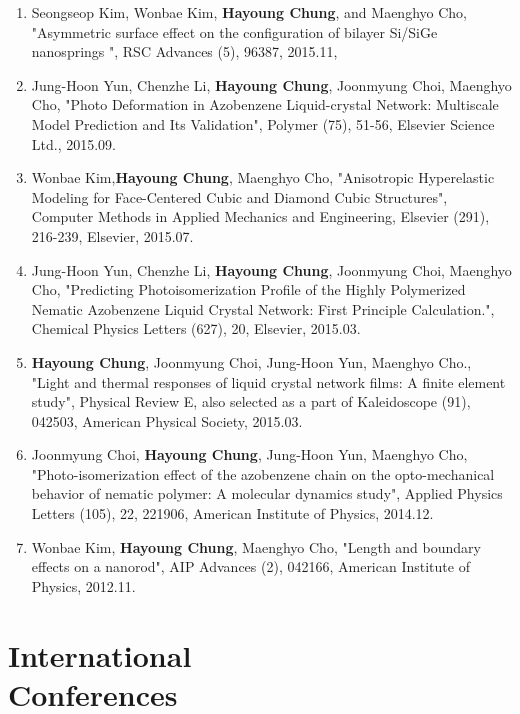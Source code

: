 \documentclass[margin, 10pt]{res} %
\begin{document}
\begin{resume}
\begin{enumerate}
    \item Seongseop Kim, Wonbae Kim, \textbf{Hayoung Chung}, and Maenghyo Cho, "Asymmetric surface effect on the configuration of bilayer Si/SiGe nanosprings ", RSC Advances (5), 96387, 2015.11,  %
    \item Jung-Hoon Yun, Chenzhe Li, \textbf{Hayoung Chung}, Joonmyung Choi, Maenghyo Cho, "Photo Deformation in Azobenzene Liquid-crystal Network: Multiscale Model Prediction and Its Validation", Polymer (75), 51-56, Elsevier Science Ltd., 2015.09. %
    \item Wonbae Kim,\textbf{Hayoung Chung}, Maenghyo Cho, "Anisotropic Hyperelastic Modeling for Face-Centered Cubic and Diamond Cubic Structures", Computer Methods in Applied Mechanics and Engineering, Elsevier (291), 216-239, Elsevier, 2015.07. %
    \item Jung-Hoon Yun, Chenzhe Li, \textbf{Hayoung Chung}, Joonmyung Choi, Maenghyo Cho, "Predicting Photoisomerization Profile of the Highly Polymerized Nematic Azobenzene Liquid Crystal Network: First Principle Calculation.", Chemical Physics Letters (627), 20, Elsevier, 2015.03. %
    \item \textbf{Hayoung Chung}, Joonmyung Choi, Jung-Hoon Yun, Maenghyo Cho., "Light and thermal responses of liquid crystal network films: A finite element study", Physical Review E, also selected as a part of Kaleidoscope (91), 042503, American Physical Society, 2015.03. %
    \item Joonmyung Choi, \textbf{Hayoung Chung}, Jung-Hoon Yun, Maenghyo Cho, "Photo-isomerization effect of the azobenzene chain on the opto-mechanical behavior of nematic polymer: A molecular dynamics study", Applied Physics Letters (105), 22, 221906, American Institute of Physics, 2014.12.  %
    \item Wonbae Kim, \textbf{Hayoung Chung}, Maenghyo Cho, "Length and boundary effects on a nanorod", AIP Advances (2), 042166, American Institute of Physics, 2012.11.
    
\end{enumerate}

\section{International \\ Conferences}


\end{resume}
\end{document}
